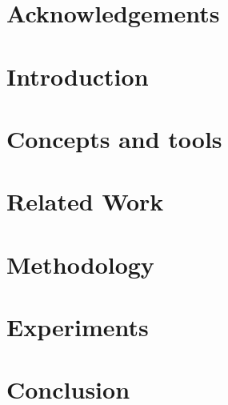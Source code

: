 \documentclass[11pt]{book}
\begin{document}

\doublespacing



\chapter*{Acknowledgements}



\tableofcontents{}
\printacronyms[name=List of Abbreviations, heading=chapter*]
\listoffigures
{}
\listoftables
{}
\clearpage


% 

\chapter {Introduction}


\chapter {Concepts and tools}


\chapter {Related Work}
\label{literature}



\chapter{Methodology}
\label{sec:exp}


\chapter {Experiments}
\label{chapter:four}


\chapter{Conclusion}


\renewcommand{\bibname}{References}
	

\end{document}
